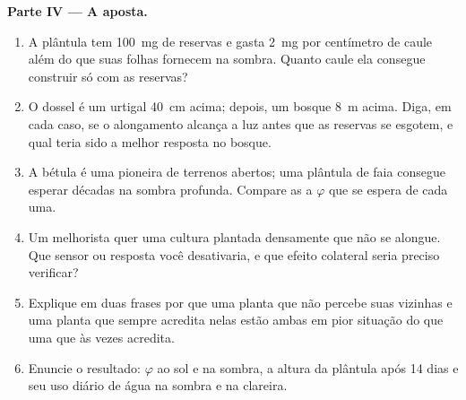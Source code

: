 \begin{problem}
\medskip
\noindent\textbf{Parte IV --- A aposta.}
\begin{enumerate}[resume]
  \item A plântula tem \qty{100}{mg} de reservas e gasta \qty{2}{mg}
        por centímetro de caule além do que suas folhas fornecem na
        sombra. Quanto caule ela consegue construir só com as reservas?
  \item O dossel é um urtigal \qty{40}{cm} acima; depois, um bosque
        \qty{8}{m} acima. Diga, em cada caso, se o alongamento alcança a
        luz antes que as reservas se esgotem, e qual teria sido a melhor
        resposta no bosque.
  \item A bétula é uma pioneira de terrenos abertos; uma plântula de faia
        consegue esperar décadas na sombra profunda. Compare as  a $\varphi$ que se espera de cada uma.
  \item Um melhorista quer uma cultura plantada densamente que não se
        alongue. Que sensor ou resposta você desativaria, e que efeito
        colateral seria preciso verificar?
  \item Explique em duas frases por que uma planta que não percebe suas
        vizinhas e uma planta que sempre acredita nelas estão ambas em
        pior situação do que uma que às vezes acredita.
  \item Enuncie o resultado: $\varphi$ ao sol e na sombra, a altura da
        plântula após 14 dias e seu uso diário de água na sombra e na
        clareira.
\end{enumerate}
\end{problem}
